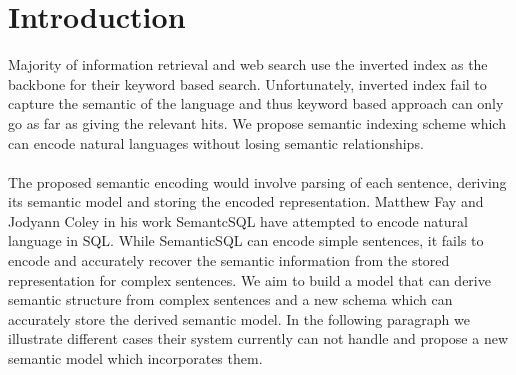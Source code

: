 \documentclass[10pt]{article}
\begin{document}
 

\section{Introduction}
Majority of information retrieval and web search use the inverted index as the backbone for their keyword based search. Unfortunately, inverted index fail to capture the semantic of the language and thus keyword based approach can only go as far as giving the relevant hits. We propose semantic indexing scheme which can encode natural languages without losing semantic relationships.
 \\
 \\
The proposed semantic encoding would involve parsing of each sentence, deriving its semantic model and storing the encoded representation. Matthew Fay and Jodyann Coley in his work SemantcSQL have attempted to encode natural language in SQL. While SemanticSQL can encode simple sentences, it fails to encode and accurately recover the semantic information from the stored representation for complex sentences. We aim to build a model that can derive semantic structure from complex sentences and a new schema which can accurately store the derived semantic model. In the following paragraph we illustrate different cases their system currently can not handle and propose a new semantic model which incorporates them.
\end{document}
